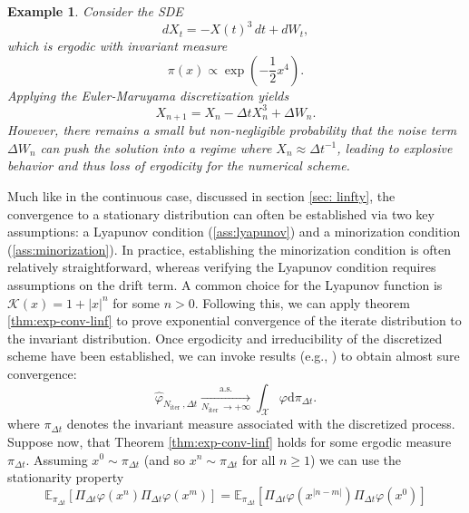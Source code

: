 \documentclass{article}
\newtheorem{example}[theorem]{Example}
\begin{document}
\begin{example}
Consider the SDE
\[
dX_t = -X(t)^3\,dt + dW_t,
\]
which is ergodic with invariant measure
\[
\pi(x) \propto \exp\left(-\frac{1}{2}x^4\right).
\]
Applying the Euler-Maruyama discretization yields
\[
X_{n+1} = X_n - \Delta t X_n^3 + \Delta W_n.
\]
However, there remains a small but non-negligible probability that the noise term $\Delta W_n$ can push the solution into a regime where $X_n \approx \Delta t^{-1}$, leading to explosive behavior and thus loss of ergodicity for the numerical scheme.
\end{example}
Much like in the continuous case, discussed in section \ref{sec: linfty}, the convergence to a stationary distribution can often be established via two key assumptions: a Lyapunov condition (\ref{ass:lyapunov}) and a minorization condition (\ref{ass:minorization}). In practice, establishing the minorization condition is often relatively straightforward, whereas verifying the Lyapunov condition requires assumptions on the drift term\cite{mattingly2002ergodicity}. A common choice for the Lyapunov function is $\mathcal{K}(x) = 1 + |x|^n$ for some $n > 0$. Following this, we can apply theorem \ref{thm:exp-conv-linf} to prove exponential convergence of the iterate distribution to the invariant distribution. Once ergodicity and irreducibility of the discretized scheme have been established, we can invoke results (e.g., \cite[Chapter~17]{Meyn2012-oq}) to obtain almost sure convergence:
\begin{equation}
\widehat{\varphi}_{N_{\text {iter }}, \Delta t} \xrightarrow[N_{\text {iter }} \rightarrow+\infty]{\text { a.s. }} \int_{\mathcal{X}} \varphi \mathrm{d} \pi_{\Delta t} .
\end{equation}
where $\pi_{\Delta t}$ denotes the invariant measure associated with the discretized process.
Suppose now, that Theorem \ref{thm:exp-conv-linf} holds for some ergodic measure $\pi_{\Delta t}$. Assuming $x^0 \sim \pi_{\Delta t}$ (and so $x^n \sim \pi_{\Delta t}$ for all $n\geq 1$) we can use the stationarity property
\begin{equation}
\mathbb{E}_{\pi_{\Delta t}}\left[\Pi_{\Delta t} \varphi\left(x^n\right) \Pi_{\Delta t} \varphi\left(x^m\right)\right]=\mathbb{E}_{\pi_{\Delta t}}\left[\Pi_{\Delta t} \varphi\left(x^{|n-m|}\right) \Pi_{\Delta t} \varphi\left(x^0\right)\right]
\end{equation}
\end{document}
